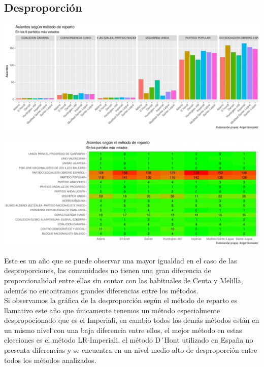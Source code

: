 \documentclass[12pt,a4paper,]{book}
\numberwithin{dummy}{section}
\theoremstyle{ocrenumbox}
\theoremstyle{blacknumex}
\theoremstyle{blacknumbox}
\theoremstyle{ocrenum}
\theoremstyle{ocrenum}
\begin{document}
\hypertarget{desproporciuxf3n-9}{%
\subsection{Desproporción}\label{desproporciuxf3n-9}}

\begin{center}\includegraphics[width=1\linewidth]{figurasR/unnamed-chunk-104-1} \end{center}

\begin{center}\includegraphics[width=1\linewidth]{figurasR/unnamed-chunk-104-2} \end{center}

Este es un año que se puede observar una mayor igualdad en el caso de
las desproporciones, las comunidades no tienen una gran diferencia de
proporcionalidad entre ellas sin contar con las habituales de Ceuta y
Melilla, además no encontramos grandes diferencias entre los métodos.\\
Si observamos la gráfica de la desproporción según el método de reparto
es llamativo este año que únicamente tenemos un método especialmente
despropocionado que es el Imperiali, en cambio todos los demás métodos
están en un mismo nivel con una baja diferencia entre ellos, el mejor
método en estas elecciones es el método LR-Imperiali, el método D´Hont
utilizado en España no presenta diferencias y se encuentra en un nivel
medio-alto de desproporción entre todos los métodos analizados.
\end{document}
